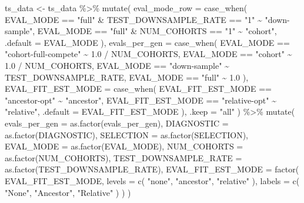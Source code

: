 \documentclass[
]{book}
\newenvironment{Shaded}{\begin{snugshade}}{\end{snugshade}}
\newcommand{\AttributeTok}[1]{\textcolor[rgb]{0.77,0.63,0.00}{#1}}
\newcommand{\FloatTok}[1]{\textcolor[rgb]{0.00,0.00,0.81}{#1}}
\newcommand{\FunctionTok}[1]{\textcolor[rgb]{0.00,0.00,0.00}{#1}}
\newcommand{\NormalTok}[1]{#1}
\newcommand{\OtherTok}[1]{\textcolor[rgb]{0.56,0.35,0.01}{#1}}
\newcommand{\SpecialCharTok}[1]{\textcolor[rgb]{0.00,0.00,0.00}{#1}}
\newcommand{\StringTok}[1]{\textcolor[rgb]{0.31,0.60,0.02}{#1}}
\begin{document}
\begin{Shaded}
\begin{Highlighting}[]
\NormalTok{ts\_data }\OtherTok{\textless{}{-}}\NormalTok{ ts\_data }\SpecialCharTok{\%\textgreater{}\%}
  \FunctionTok{mutate}\NormalTok{(}
    \AttributeTok{eval\_mode\_row =} \FunctionTok{case\_when}\NormalTok{(}
\NormalTok{      EVAL\_MODE }\SpecialCharTok{==} \StringTok{"full"} \SpecialCharTok{\&}\NormalTok{ TEST\_DOWNSAMPLE\_RATE }\SpecialCharTok{==} \StringTok{"1"} \SpecialCharTok{\textasciitilde{}} \StringTok{"down{-}sample"}\NormalTok{,}
\NormalTok{      EVAL\_MODE }\SpecialCharTok{==} \StringTok{"full"} \SpecialCharTok{\&}\NormalTok{ NUM\_COHORTS }\SpecialCharTok{==} \StringTok{"1"} \SpecialCharTok{\textasciitilde{}} \StringTok{"cohort"}\NormalTok{,}
      \AttributeTok{.default =}\NormalTok{ EVAL\_MODE}
\NormalTok{    ),}
    \AttributeTok{evals\_per\_gen =} \FunctionTok{case\_when}\NormalTok{(}
\NormalTok{      EVAL\_MODE }\SpecialCharTok{==} \StringTok{"cohort{-}full{-}compete"} \SpecialCharTok{\textasciitilde{}} \FloatTok{1.0} \SpecialCharTok{/}\NormalTok{ NUM\_COHORTS,}
\NormalTok{      EVAL\_MODE }\SpecialCharTok{==} \StringTok{"cohort"} \SpecialCharTok{\textasciitilde{}} \FloatTok{1.0} \SpecialCharTok{/}\NormalTok{ NUM\_COHORTS,}
\NormalTok{      EVAL\_MODE }\SpecialCharTok{==} \StringTok{"down{-}sample"} \SpecialCharTok{\textasciitilde{}}\NormalTok{ TEST\_DOWNSAMPLE\_RATE,}
\NormalTok{      EVAL\_MODE }\SpecialCharTok{==} \StringTok{"full"} \SpecialCharTok{\textasciitilde{}} \FloatTok{1.0}
\NormalTok{    ),}
    \AttributeTok{EVAL\_FIT\_EST\_MODE =} \FunctionTok{case\_when}\NormalTok{(}
\NormalTok{      EVAL\_FIT\_EST\_MODE }\SpecialCharTok{==} \StringTok{"ancestor{-}opt"} \SpecialCharTok{\textasciitilde{}} \StringTok{"ancestor"}\NormalTok{,}
\NormalTok{      EVAL\_FIT\_EST\_MODE }\SpecialCharTok{==} \StringTok{"relative{-}opt"} \SpecialCharTok{\textasciitilde{}} \StringTok{"relative"}\NormalTok{,}
      \AttributeTok{.default =}\NormalTok{ EVAL\_FIT\_EST\_MODE}
\NormalTok{    ),}
    \AttributeTok{.keep =} \StringTok{"all"}
\NormalTok{  ) }\SpecialCharTok{\%\textgreater{}\%}
  \FunctionTok{mutate}\NormalTok{(}
    \AttributeTok{evals\_per\_gen =} \FunctionTok{as.factor}\NormalTok{(evals\_per\_gen),}
    \AttributeTok{DIAGNOSTIC =} \FunctionTok{as.factor}\NormalTok{(DIAGNOSTIC),}
    \AttributeTok{SELECTION =} \FunctionTok{as.factor}\NormalTok{(SELECTION),}
    \AttributeTok{EVAL\_MODE =} \FunctionTok{as.factor}\NormalTok{(EVAL\_MODE),}
    \AttributeTok{NUM\_COHORTS =} \FunctionTok{as.factor}\NormalTok{(NUM\_COHORTS),}
    \AttributeTok{TEST\_DOWNSAMPLE\_RATE =} \FunctionTok{as.factor}\NormalTok{(TEST\_DOWNSAMPLE\_RATE),}
    \AttributeTok{EVAL\_FIT\_EST\_MODE =} \FunctionTok{factor}\NormalTok{(}
\NormalTok{      EVAL\_FIT\_EST\_MODE,}
      \AttributeTok{levels =} \FunctionTok{c}\NormalTok{(}
        \StringTok{"none"}\NormalTok{,}
        \StringTok{"ancestor"}\NormalTok{,}
        \StringTok{"relative"}
\NormalTok{      ),}
      \AttributeTok{labels =} \FunctionTok{c}\NormalTok{(}
        \StringTok{"None"}\NormalTok{,}
        \StringTok{"Ancestor"}\NormalTok{,}
        \StringTok{"Relative"}
\NormalTok{      )}
\NormalTok{    )}
\NormalTok{  )}


\end{Highlighting}
\end{Shaded}
\end{document}

